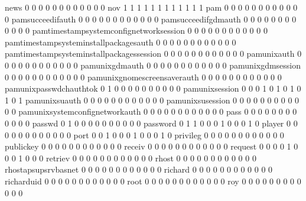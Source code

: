 \documentclass[compress,8pt]{beamer}
\begin{document}
\begin{frame}
\begin{Schunk}
  news                                      0  0  0  0  0  0  0  0  0  0  0  0
  nov                                       1  1  1  1  1  1  1  1  1  1  1  1
  pam                                       0  0  0  0  0  0  0  0  0  0  0  0
  pamsucceedifauth                          0  0  0  0  0  0  0  0  0  0  0  0
  pamsucceedifgdmauth                       0  0  0  0  0  0  0  0  0  0  0  0
  pamtimestampsystemconfignetworksession    0  0  0  0  0  0  0  0  0  0  0  0
  pamtimestampsysteminstallpackagesauth     0  0  0  0  0  0  0  0  0  0  0  0
  pamtimestampsysteminstallpackagessession  0  0  0  0  0  0  0  0  0  0  0  0
  pamunixauth                               0  0  0  0  0  0  0  0  0  0  0  0
  pamunixgdmauth                            0  0  0  0  0  0  0  0  0  0  0  0
  pamunixgdmsession                         0  0  0  0  0  0  0  0  0  0  0  0
  pamunixgnomescreensaverauth               0  0  0  0  0  0  0  0  0  0  0  0
  pamunixpasswdchauthtok                    0  1  0  0  0  0  0  0  0  0  0  0
  pamunixsession                            0  0  0  1  0  1  0  1  0  1  0  1
  pamunixsuauth                             0  0  0  0  0  0  0  0  0  0  0  0
  pamunixsusession                          0  0  0  0  0  0  0  0  0  0  0  0
  pamunixsystemconfignetworkauth            0  0  0  0  0  0  0  0  0  0  0  0
  pass                                      0  0  0  0  0  0  0  0  0  0  0  0
  passwd                                    0  1  0  0  0  0  0  0  0  0  0  0
  password                                  0  1  1  0  0  0  1  0  0  0  1  0
  player                                    0  0  0  0  0  0  0  0  0  0  0  0
  port                                      0  0  1  0  0  0  1  0  0  0  1  0
  privileg                                  0  0  0  0  0  0  0  0  0  0  0  0
  publickey                                 0  0  0  0  0  0  0  0  0  0  0  0
  receiv                                    0  0  0  0  0  0  0  0  0  0  0  0
  request                                   0  0  0  0  1  0  0  0  1  0  0  0
  retriev                                   0  0  0  0  0  0  0  0  0  0  0  0
  rhost                                     0  0  0  0  0  0  0  0  0  0  0  0
  rhostapsupsrvbasnet                       0  0  0  0  0  0  0  0  0  0  0  0
  richard                                   0  0  0  0  0  0  0  0  0  0  0  0
  richarduid                                0  0  0  0  0  0  0  0  0  0  0  0
  root                                      0  0  0  0  0  0  0  0  0  0  0  0
  roy                                       0  0  0  0  0  0  0  0  0  0  0  0

\end{Schunk}
\end{frame}
\end{document}
